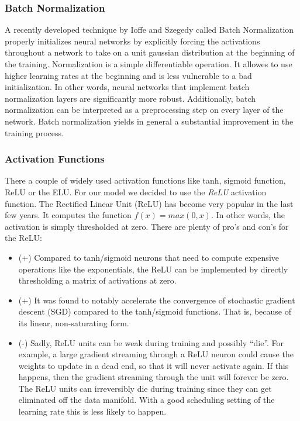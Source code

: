 \documentclass[journal]{IEEEtran}
\begin{document}
\subsubsection{Batch Normalization}
\noindent A recently developed technique by Ioffe and Szegedy \cite{RN4} called Batch Normalization  properly initializes neural networks by explicitly forcing the activations throughout a network to take on a unit gaussian distribution at the beginning of the training. Normalization is a simple differentiable operation. 
It allowes to use higher learning rates at the beginning and is less vulnerable to a bad initialization. In other words, neural networks that implement batch normalization layers are significantly more robust. Additionally, batch normalization can be interpreted as a preprocessing step on every layer of the network. Batch normalization yields in general a substantial improvement in the training process. \\
\subsubsection{Activation Functions}
\label{sec:activationFunctions}
\noindent There a couple of widely used activation functions like tanh, sigmoid function, ReLU or the ELU. For our model we decided to use the \textit{ReLU} activation function. The Rectified Linear Unit (ReLU) has become very popular in the last few years. It computes the function \(f(x)=max(0,x)\). In other words, the activation is simply thresholded at zero. There are plenty of pro's and con's for the ReLU:
\begin{itemize}
\item (+) Compared to tanh/sigmoid neurons that need to compute expensive operations  like the exponentials, the ReLU can be implemented by directly thresholding a matrix of activations at zero.
\item (+) It was found to notably accelerate the convergence of stochastic gradient descent (SGD) compared to the tanh/sigmoid functions. That is, because of its linear, non-saturating form.
\item (-) Sadly, ReLU units can be weak during training and possibly “die”. For example, a large gradient streaming through a ReLU neuron could cause the weights to update in a dead end, so that it will never activate again. If this happens, then the gradient streaming through the unit will forever be zero. The ReLU units can irreversibly die during training since they can get eliminated off the data manifold. With a good scheduling setting of the learning rate this is less likely to happen. \\
\end{itemize}
\end{document}
